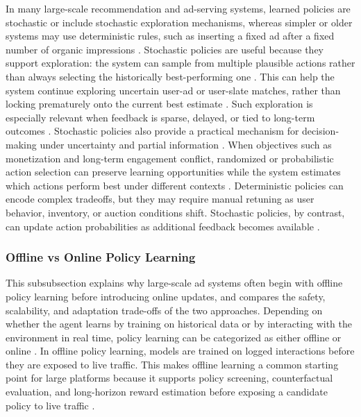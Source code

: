 \documentclass[manuscript,review,screen]{acmart}
\begin{document}
In many large-scale recommendation and ad-serving systems, learned policies are stochastic or include stochastic exploration mechanisms, whereas simpler or older systems may use deterministic rules, such as inserting a fixed ad after a fixed number of organic impressions \cite{gauci2018horizon, zhao2021dear}. Stochastic policies are useful because they support exploration: the system can sample from multiple plausible actions rather than always selecting the historically best-performing one \cite{Sutton1998, russo2018tutorial}. This can help the system continue exploring uncertain user-ad or user-slate matches, rather than locking prematurely onto the current best estimate \cite{russo2018tutorial, bietti2021contextual, zhao2021dear}. Such exploration is especially relevant when feedback is sparse, delayed, or tied to long-term outcomes \cite{zou2019reinforcement, mazoure2021improving}. Stochastic policies also provide a practical mechanism for decision-making under uncertainty and partial information \cite{dulac2021challenges, russo2018tutorial}. When objectives such as monetization and long-term engagement conflict, randomized or probabilistic action selection can preserve learning opportunities while the system estimates which actions perform best under different contexts \cite{Mehrotra2020, Jannach2023, bietti2021contextual}. Deterministic policies can encode complex tradeoffs, but they may require manual retuning as user behavior, inventory, or auction conditions shift. Stochastic policies, by contrast, can update action probabilities as additional feedback becomes available \cite{russo2018tutorial, gauci2018horizon}.

\subsubsection{Offline vs Online Policy Learning}
This subsubsection explains why large-scale ad systems often begin with offline policy learning before introducing online updates, and compares the safety, scalability, and adaptation trade-offs of the two approaches.
Depending on whether the agent learns by training on historical data or by interacting with the environment in real time, policy learning can be categorized as either offline or online \cite{Sutton1998}. In offline policy learning, models are trained on logged interactions before they are exposed to live traffic. This makes offline learning a common starting point for large platforms because it supports policy screening, counterfactual evaluation, and long-horizon reward estimation before exposing a candidate policy to live traffic \cite{levine2020offline, chen2022off, gauci2018horizon}.
\end{document}
